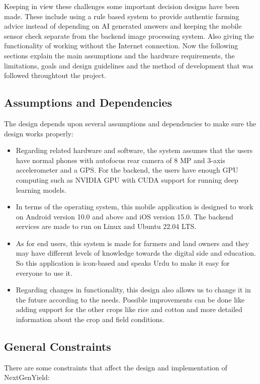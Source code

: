 \documentclass{FastFyp}
\begin{document}
Keeping in view these challenges some important decision designs have been made. These include using a rule based system to provide authentic farming advice instead of depending on AI generated answers and keeping the mobile sensor check separate from the backend image processing system. Also giving the functionality of working without the Internet connection. Now the following sections explain the main assumptions and the hardware requirements, the limitations, goals and design guidelines and the method of development that was followed throughtout the project.

\subsection{Assumptions and Dependencies}
The design depends upon several assumptions and dependencies to make sure the
design works properly:

\begin{itemize}
    \item Regarding related hardware and software, the system assumes that the
    users have normal phones with autofocus rear camera of 8 MP and 3-axis
    accelerometer and a GPS. For the backend, the users have enough GPU
    computing such as NVIDIA GPU with CUDA support for running deep learning
    models.

    \item In terms of the operating system, this mobile application is
    designed to work on Android version 10.0 and above and iOS version 15.0.
    The backend services are made to run on Linux and Ubuntu 22.04 LTS.

    \item As for end users, this system is made for farmers and land owners
    and they may have different levels of knowledge towards the digital side
    and education. So this application is icon-based and speaks Urdu to make
    it easy for everyone to use it.

    \item Regarding changes in functionality, this design also allows us to
    change it in the future according to the needs. Possible improvements can
    be done like adding support for the other crops like rice and cotton and
    more detailed information about the crop and field conditions.
\end{itemize}

 
\subsection{General Constraints}
There are some constraints that affect the design and implementation of
NextGenYield:
\end{document}
